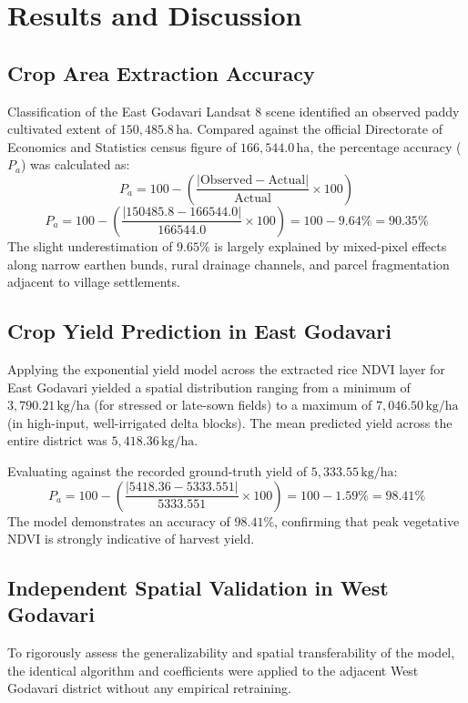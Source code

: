 \documentclass[11pt,a4paper]{article}
\begin{document}
\section{Results and Discussion}

\subsection{Crop Area Extraction Accuracy}
Classification of the East Godavari Landsat 8 scene identified an observed paddy cultivated extent of $150,485.8\,\text{ha}$. Compared against the official Directorate of Economics and Statistics census figure of $166,544.0\,\text{ha}$, the percentage accuracy ($P_a$) was calculated as:
\begin{equation}
P_a = 100 - \left( \frac{|\text{Observed} - \text{Actual}|}{\text{Actual}} \times 100 \right)
\end{equation}
\begin{equation}
P_a = 100 - \left( \frac{|150485.8 - 166544.0|}{166544.0} \times 100 \right) = 100 - 9.64\% = 90.35\%
\end{equation}
The slight underestimation of $9.65\%$ is largely explained by mixed-pixel effects along narrow earthen bunds, rural drainage channels, and parcel fragmentation adjacent to village settlements.

\subsection{Crop Yield Prediction in East Godavari}
Applying the exponential yield model across the extracted rice NDVI layer for East Godavari yielded a spatial distribution ranging from a minimum of $3,790.21\,\text{kg/ha}$ (for stressed or late-sown fields) to a maximum of $7,046.50\,\text{kg/ha}$ (in high-input, well-irrigated delta blocks). The mean predicted yield across the entire district was $5,418.36\,\text{kg/ha}$.

Evaluating against the recorded ground-truth yield of $5,333.55\,\text{kg/ha}$:
\begin{equation}
P_a = 100 - \left( \frac{|5418.36 - 5333.551|}{5333.551} \times 100 \right) = 100 - 1.59\% = 98.41\%
\end{equation}
The model demonstrates an accuracy of $98.41\%$, confirming that peak vegetative NDVI is strongly indicative of harvest yield.

\subsection{Independent Spatial Validation in West Godavari}
To rigorously assess the generalizability and spatial transferability of the model, the identical algorithm and coefficients were applied to the adjacent West Godavari district without any empirical retraining. 
\end{document}
